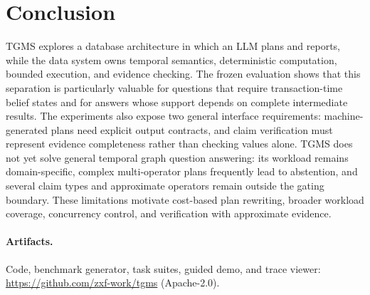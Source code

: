 \documentclass[11pt]{article}
\begin{document}
\section{Conclusion}
TGMS explores a database architecture in which an LLM plans and
reports, while the data system owns temporal semantics, deterministic
computation, bounded execution, and evidence checking. The frozen
evaluation shows that this separation is particularly valuable for
questions that require transaction-time belief states and for answers
whose support depends on complete intermediate results. The experiments
also expose two general interface requirements: machine-generated plans
need explicit output contracts, and claim verification must represent
evidence completeness rather than checking values alone. TGMS does not
yet solve general temporal graph question answering: its workload
remains domain-specific, complex multi-operator plans frequently lead
to abstention, and several claim types and approximate operators remain
outside the gating boundary. These limitations motivate cost-based plan
rewriting, broader workload coverage, concurrency control, and
verification with approximate evidence.

\paragraph{Artifacts.}
Code, benchmark generator, task suites, guided demo, and trace viewer:
\url{https://github.com/zxf-work/tgms} (Apache-2.0).



\end{document}
